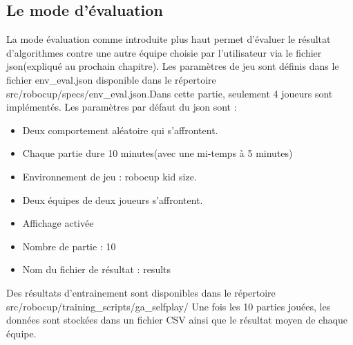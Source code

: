 \documentclass[11pt, a4paper]{article}
\begin{document}
	\subsection{Le mode d'évaluation}
	La mode évaluation comme introduite plus haut permet d'évaluer le résultat d'algorithmes contre une autre équipe choisie par l'utilisateur via le fichier json(expliqué au prochain chapitre). Les paramètres de jeu sont définis dans le fichier env\_eval.json disponible dans le répertoire
	src/robocup/specs/env\_eval.json.Dans cette partie, seulement 4 joueurs sont implémentés.
	Les paramètres par défaut du json sont :
	\begin{itemize}
		\item Deux comportement aléatoire qui s'affrontent.
		\item Chaque partie dure 10 minutes(avec une mi-temps à 5 minutes)
		\item Environnement de jeu : robocup kid size.
		\item Deux équipes de deux joueurs s'affrontent.
		\item Affichage activée
		\item Nombre de partie : 10
		\item Nom du fichier de résultat : results
	\end{itemize}

	Des résultats d'entrainement sont disponibles dans le répertoire src/robocup/training\_scripts/ga\_selfplay/
	Une fois les 10 parties jouées, les données sont stockées dans un fichier CSV ainsi que le résultat moyen de chaque équipe.
\end{document}
